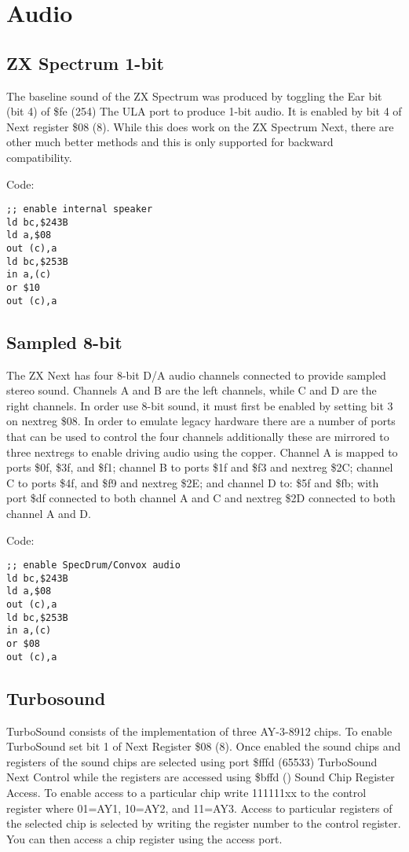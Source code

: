 \chapter{Audio}
\section{ZX Spectrum 1-bit}
\begin{multicols}{2}
The baseline sound of the ZX Spectrum was produced by toggling the Ear
bit (bit 4) of \$fe (254) The ULA port to produce 1-bit audio.  It is
enabled by bit 4 of Next register \$08 (8).  While this does work on
the ZX Spectrum Next, there are other much better methods and this is
only supported for backward compatibility.

\sinset
Code:
\begin{verbatim}
;; enable internal speaker
ld bc,$243B
ld a,$08
out (c),a
ld bc,$253B
in a,(c)
or $10
out (c),a
\end{verbatim}
\einset

\section{Sampled 8-bit}

The ZX Next has four 8-bit D/A audio channels connected to provide
sampled stereo sound. Channels A and B are the left channels, while C
and D are the right channels. In order use 8-bit sound, it must first
be enabled by setting bit 3 on nextreg \$08. In order to emulate
legacy hardware there are a number of ports that can be used to
control the four channels additionally these are mirrored to three
nextregs to enable driving audio using the copper.  Channel A is
mapped to ports \$0f, \$3f, and \$f1; channel B to ports \$1f and \$f3
and nextreg \$2C; channel C to ports \$4f, and \$f9 and nextreg \$2E;
and channel D to: \$5f and \$fb; with port \$df connected to both
channel A and C and nextreg \$2D connected to both channel A and D.

\sinset
Code:
\begin{verbatim}
;; enable SpecDrum/Convox audio
ld bc,$243B
ld a,$08
out (c),a
ld bc,$253B
in a,(c)
or $08
out (c),a
\end{verbatim}
\einset

\section{Turbosound}

TurboSound consists of the implementation of three AY-3-8912 chips. To
enable TurboSound set bit 1 of Next Register \$08 (8). Once enabled
the sound chips and registers of the sound chips are selected using
port \$fffd (65533) TurboSound Next Control while the registers are
accessed using \$bffd () Sound Chip Register Access.  To enable access
to a particular chip write 111111xx to the control register where
01=AY1, 10=AY2, and 11=AY3.  Access to particular registers of the
selected chip is selected by writing the register number to the
control register. You can then access a chip register using the access
port.


\end{multicols}

